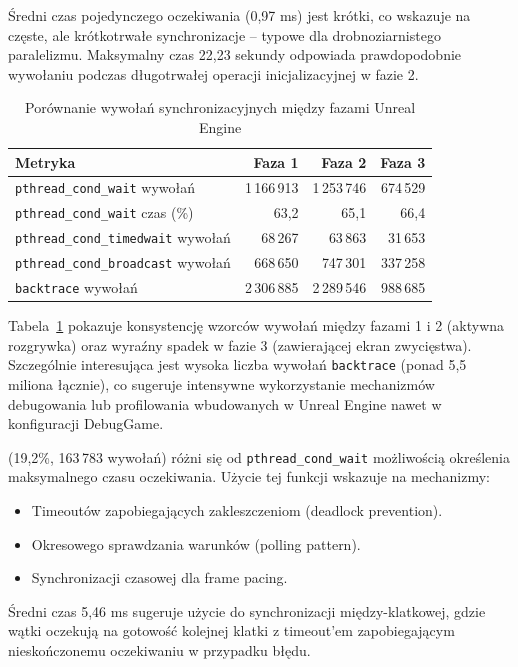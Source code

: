Średni czas pojedynczego oczekiwania (0,97 ms) jest krótki, co wskazuje na częste, ale krótkotrwałe synchronizacje -- 
typowe dla drobnoziarnistego paralelizmu. Maksymalny czas 22,23 sekundy odpowiada prawdopodobnie wywołaniu podczas długotrwałej operacji 
inicjalizacyjnej w fazie 2.

\begin{table}[H]
\centering
\caption{Porównanie wywołań synchronizacyjnych między fazami Unreal Engine}
\label{tab:unreal-osrt-phases}
\small
\begin{tabular}{|l|r|r|r|}
\hline
\textbf{Metryka} & \textbf{Faza 1} & \textbf{Faza 2} & \textbf{Faza 3} \\
\hline
\texttt{pthread\_cond\_wait} wywołań & 1\,166\,913 & 1\,253\,746 & 674\,529 \\
\texttt{pthread\_cond\_wait} czas (\%) & 63,2 & 65,1 & 66,4 \\
\texttt{pthread\_cond\_timedwait} wywołań & 68\,267 & 63\,863 & 31\,653 \\
\texttt{pthread\_cond\_broadcast} wywołań & 668\,650 & 747\,301 & 337\,258 \\
\texttt{backtrace} wywołań & 2\,306\,885 & 2\,289\,546 & 988\,685 \\
\hline
\end{tabular}
\end{table}

Tabela~\ref{tab:unreal-osrt-phases} pokazuje konsystencję wzorców wywołań między fazami 1 i 2 (aktywna rozgrywka) oraz wyraźny spadek w 
fazie 3 (zawierającej ekran zwycięstwa). Szczególnie interesująca jest wysoka liczba wywołań \texttt{backtrace} (ponad 5,5 miliona łącznie), 
co sugeruje intensywne wykorzystanie mechanizmów debugowania lub profilowania wbudowanych w Unreal Engine nawet w konfiguracji DebugGame.

(19,2\%, 163\,783 wywołań) różni się od 
\texttt{pthread\_cond\_wait} możliwością określenia maksymalnego czasu 
oczekiwania. Użycie tej funkcji wskazuje na mechanizmy:
\begin{itemize}
    \item Timeoutów zapobiegających zakleszczeniom (deadlock prevention).
    \item Okresowego sprawdzania warunków (polling pattern).
    \item Synchronizacji czasowej dla frame pacing.
\end{itemize}

Średni czas 5,46 ms sugeruje użycie do synchronizacji między-klatkowej,
gdzie wątki oczekują na gotowość kolejnej klatki z timeout'em 
zapobiegającym nieskończonemu oczekiwaniu w przypadku błędu.


